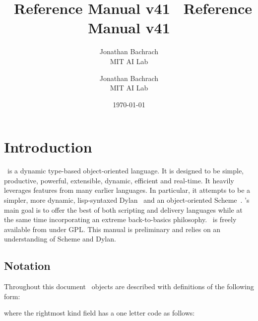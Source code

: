 \documentclass[twoside,twocolumn,9pt]{extarticle}
\begin{document}
\label{top_node}

\T\sloppy    %

\T\title{{\Huge \goo\ Reference Manual v41 }}
\T\author{{\huge Jonathan Bachrach} \\ {\Large MIT AI Lab}}
\W\title{{\huge \goo\ Reference Manual v41 }}
\W\author{{\Large Jonathan Bachrach} \\ {\Large MIT AI Lab}}
\date{\today}


\maketitle

\section{Introduction}

\goo\ is a dynamic type-based object-oriented language.  It is
designed to be simple, productive, powerful, extensible, dynamic,
efficient and real-time.  It heavily leverages features from many
earlier languages.  In particular, it attempts to be a simpler,
more dynamic, lisp-syntaxed Dylan~\cite{Shalit:1996} and an object-oriented 
Scheme~\cite{Kelsey:Clinger:Rees:hosc:1998}.
\goo's main goal is to offer the best of both scripting and
delivery languages while at the same time 
incorporating an extreme back-to-basics philosophy.
\goo\ is freely available from  under GPL.
This manual is preliminary and relies on an understanding
of Scheme and Dylan.

\subsection{Notation}

Throughout this document \goo\ objects are described with definitions
of the following form:

\begin{defs}
\end{defs}

where the rightmost kind field has a one letter code as follows:

\begin{defs}
\end{defs}
\end{document}
